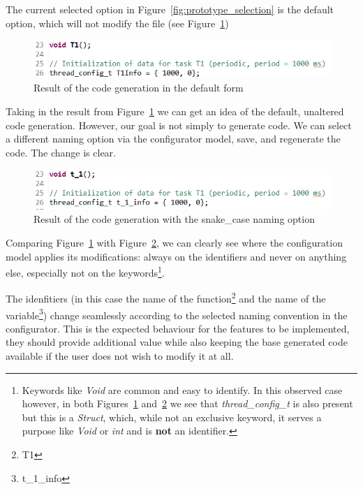 The current selected option in Figure~\ref{fig:prototype_selection} is the default option, which will not modify the file (see Figure~\ref{fig:prototype_default_option})

\begin{figure}[htbp]
	\centering
	\includegraphics[height=0.12\textwidth]{default_naming_option.png}
	\caption{Result of the code generation in the default form}
	\label{fig:prototype_default_option}
\end{figure}

Taking in the result from Figure~\ref{fig:prototype_default_option} we can get an idea of the default, unaltered code generation. However, our goal is not simply to generate code. We can select a different naming option via the configurator model, save, and regenerate the code. The change is clear.

\begin{figure}[htbp]
	\centering
	\includegraphics[height=0.12\textwidth]{snake_case_naming_option.png}
	\caption{Result of the code generation with the snake\_case naming option}
	\label{fig:prototype_snake_case}
\end{figure}

Comparing Figure~\ref{fig:prototype_default_option} with Figure~\ref{fig:prototype_snake_case}, we can clearly see where the configuration model applies its modifications: always on the identifiers and never on anything else, especially not on the keywords\footnote{Keywords like \textit{Void} are common and easy to identify. In this observed case however, in both Figures~\ref{fig:prototype_default_option} and~\ref{fig:prototype_snake_case} we see that \textit{thread\_config\_t} is also present but this is a \textit{Struct}, which, while not an exclusive keyword, it serves a purpose like \textit{Void} or \textit{int} and is \textbf{not} an identifier.}.

The idenfitiers (in this case the name of the function\footnote{T1} and the name of the variable\footnote{t\_1\_info}) change seamlessly according to the selected naming convention in the configurator. This is the expected behaviour for the features to be implemented, they should provide additional value while also keeping the base generated code available if the user does not wish to modify it at all. 

